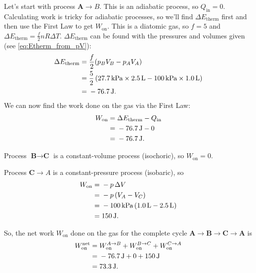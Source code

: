 \begin{example}
Let's start with process $\textbf{A} \rightarrow {B}$.  This is an adiabatic
process, so $Q_\text{in} = 0$. Calculating work is tricky for adiabatic
processes, so we'll find $\Delta E_\text{therm}$ first and then use
the First Law to get $W_\text{on}$. This is a diatomic gas, so $f = 5$
and $\Delta E_\text{therm} = \frac{f}{2}nR\Delta T$. 
$\Delta E_\text{therm}$ can be found
with the pressures and volumes given (see \eqref{eq:Etherm_from_pV}):
\begin{eqnarray}
\Delta E_\text{therm} =\mathstrut & \frac{f}{2}(p_BV_B - p_AV_A) \\
                      =\mathstrut & \frac{5}{2} \left(27.7 \,\text{kPa} \times 
                   2.5 \,\text{L} - 100 \,\text{kPa}\times 1.0 \,\text{L}\right)
                             \\
                     =\mathstrut & -76.7 \,\text{J}.
\end{eqnarray}
We can now find the work done on the gas via the First Law:
\begin{eqnarray}
  W_\text{on} =\mathstrut & \Delta E_\text{therm} - Q_\text{in}  \\
              =\mathstrut & -76.7 \,\text{J} - 0  \\
              =\mathstrut & -76.7 \,\text{J}.
\end{eqnarray}

Process $\textbf{B} \rightarrow \textbf{C}$ is a constant-volume process
(isochoric), so 
$W_\text{on} = 0$.


Process $\textbf{C} \rightarrow {A}$ is a constant-pressure 
process (isobaric), so
\begin{eqnarray}
  W_\text{on} =\mathstrut & -p\,\Delta V  \\
              =\mathstrut & -p\, (V_A - V_C)  \\
              =\mathstrut & -100 \,\text{kPa}\, (1.0 \,\text{L} - 2.5 \,\text{L})
                    \\ 
              =\mathstrut & 150 \,\text{J}.
\end{eqnarray}

So, the net work $W_\text{on}$ done on the gas for the complete cycle 
$\textbf{A} \rightarrow \textbf{B} \rightarrow \textbf{C} \rightarrow \textbf{A}$ is
\begin{eqnarray}
  W_\text{on}^\text{net} 
     =\mathstrut & W_\text{on}^{A\to B}+W_\text{on}^{B\to C}+W_\text{on}^{C\to A}
                            \\
      =\mathstrut & -76.7 \,\text{J} + 0 + 150 \,\text{J}  \\
      =\mathstrut & 73.3 \,\text{J}.
\end{eqnarray}


\end{example}
